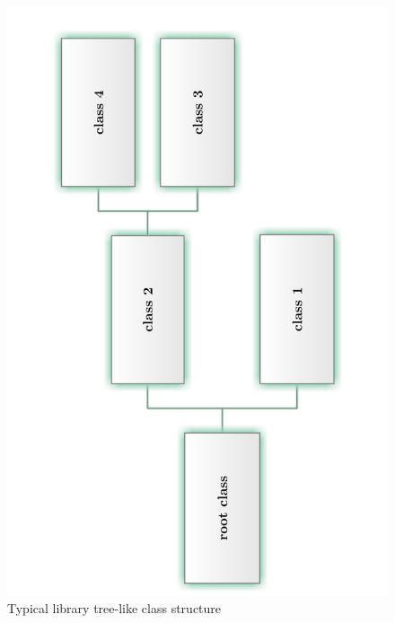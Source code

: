 \begin{figure}[ht]
\centering
\includegraphics[angle=-90,width=14cm]{graphics/laboratory/02-tree.pdf}
\caption{Typical library tree-like class structure}\label{figure:library}
\end{figure}
